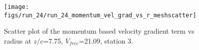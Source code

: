 \begin{figure}[H]
\centering
\texttt{[image: figs/run\_24/run\_24\_momentum\_vel\_grad\_vs\_r\_meshscatter]}
\caption{Scatter plot of the momentum based velocity gradient term vs radius at $z/c$=7.75, $V_{free}$=21.09, station 3.}
\label{fig:run_24_momentum_vel_grad_vs_r_meshscatter}
\end{figure}


